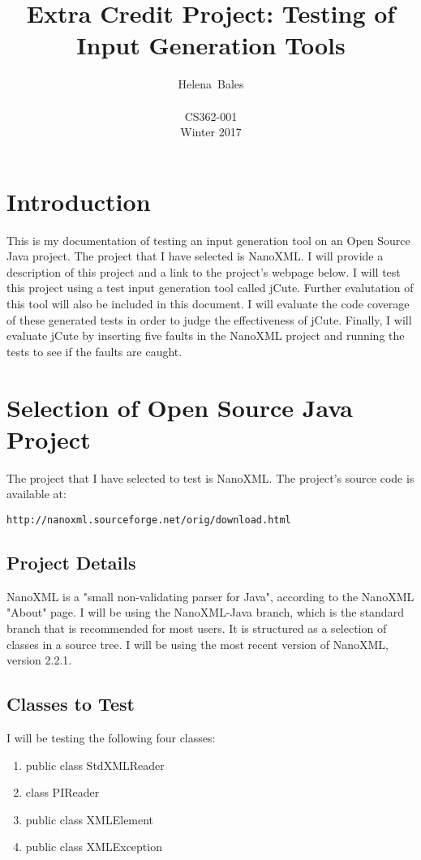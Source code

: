 \documentclass[letterpaper,10pt]{article}
\title{Extra Credit Project: Testing of Input Generation Tools}
\author{Helena~Bales\\ \\ CS362-001 \\ Winter 2017}
\begin{document}
\maketitle

\clearpage
\tableofcontents
\clearpage

\section{Introduction}
This is my documentation of testing an input generation tool on an Open Source Java project. 
The project that I have selected is NanoXML. I will provide a description of this project and a 
link to the project's webpage below. I will test this project using a test input generation tool 
called jCute. Further evalutation of this tool will also be included in this document. I will 
evaluate the code coverage of these generated tests in order to judge the effectiveness of jCute. 
Finally, I will evaluate jCute by inserting five faults in the NanoXML project and running the 
tests to see if the faults are caught.

\section{Selection of Open Source Java Project}
The project that I have selected to test is NanoXML. The project's source code is available at: 
\begin{lstlisting}
http://nanoxml.sourceforge.net/orig/download.html
\end{lstlisting}

	\subsection{Project Details}
	NanoXML is a "small non-validating parser for Java", according to the NanoXML "About" 
	page. I will be using the NanoXML-Java branch, which is the standard branch that is 
	recommended for most users. It is structured as a selection of classes in a source tree. 
	I will be using the most recent version of NanoXML, version 2.2.1.

	\subsection{Classes to Test}
	I will be testing the following four classes:
	\begin{enumerate}
		\item{public class StdXMLReader}
		\item{class PIReader}
		\item{public class XMLElement}
		\item{public class XMLException}
	\end{enumerate}
\end{document}
